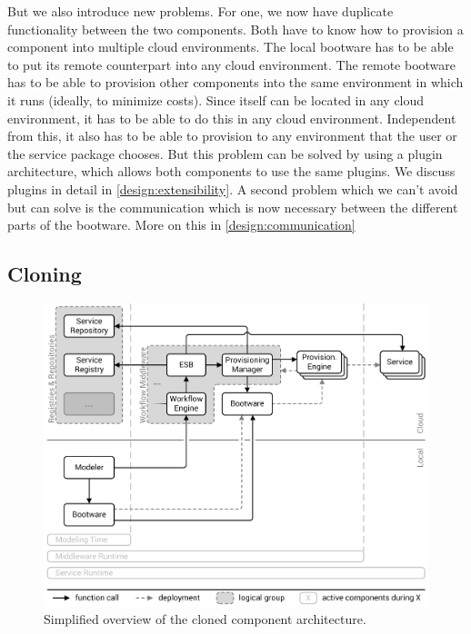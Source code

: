 But we also introduce new problems.
For one, we now have duplicate functionality between the two components.
Both have to know how to provision a component into multiple cloud environments.
The local bootware has to be able to put its remote counterpart into any cloud environment.
The remote bootware has to be able to provision other components into the same environment in which it runs (ideally, to minimize costs).
Since itself can be located in any cloud environment, it has to be able to do this in any cloud environment.
Independent from this, it also has to be able to provision to any environment that the user or the service package chooses.
But this problem can be solved by using a plugin architecture, which allows both components to use the same plugins.
We discuss plugins in detail in \autoref{design:extensibility}.
A second problem which we can't avoid but can solve is the communication which is now necessary between the different parts of the bootware.
More on this in \autoref{design:communication}

\subsection{Cloning}

\begin{figure}[!htbp]
	\centering
	\includegraphics[resolution=600]{design/assets/clone}
	\caption{Simplified overview of the cloned component architecture.}
	\label{image:clone}
\end{figure}

